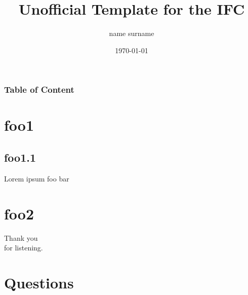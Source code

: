 \documentclass{beamer}
\author{name surname}
\title{Unofficial Template for the IFC}
\date{\today}
\begin{document}
\begin{frame}

\titlepage
\end{frame}

\begin{frame}
	\frametitle{Table of Content}
	\tableofcontents
\end{frame}

\section{foo1}
\subsection{foo1.1}
\begin{frame}{Lorem ipsum}
foo bar
\end{frame}



\section{foo2}
\begin{frame}
\vfill
\begin{center}\begin{Huge}Thank you \\[10pt]
for listening.\end{Huge}\vfill
\end{center}
\vfill
\end{frame}

\section{Questions}
\vspace*{-1cm}\hspace*{-1.8cm}
\end{document}
